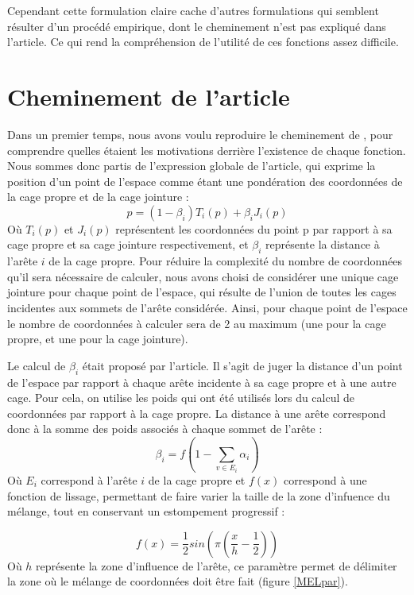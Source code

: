 Cependant cette formulation claire cache d'autres formulations qui
semblent résulter d'un procédé empirique, dont le cheminement n'est
pas expliqué dans l'article. Ce qui rend la compréhension de l'utilité
de ces fonctions assez difficile.

\section{Cheminement de l'article}
Dans un premier temps, nous avons voulu reproduire le cheminement de
\cite{GPCP13}, pour comprendre quelles étaient les motivations
derrière l'existence de chaque fonction. Nous sommes donc partis de
l'expression globale de l'article, qui exprime la position d'un point
de l'espace comme étant une pondération des coordonnées de la cage
propre et de la cage jointure :
\begin{equation}
  p = (1 - \beta_i) T_i(p)  + \beta_i J_i(p) 
  \label{MELgen}
\end{equation}
Où $T_i(p)$ et $J_i(p)$ représentent les coordonnées du point p par
rapport à sa cage propre et sa cage jointure respectivement, et
$\beta_i$ représente la distance à l'arête $i$ de la cage propre. Pour
réduire la complexité du nombre de coordonnées qu'il sera nécessaire
de calculer, nous avons choisi de considérer une unique cage jointure
pour chaque point de l'espace, qui résulte de l'union de toutes les
cages incidentes aux sommets de l'arête considérée. Ainsi, pour chaque
point de l'espace le nombre de coordonnées à calculer sera de 2 au
maximum (une pour la cage propre, et une pour la cage jointure).

Le calcul de $\beta_i$ était proposé par l'article. Il s'agit de juger
la distance d'un point de l'espace par rapport à chaque arête
incidente à sa cage propre et à une autre cage. Pour cela, on utilise
les poids qui ont été utilisés lors du calcul de coordonnées par
rapport à la cage propre. La distance à une arête correspond donc à la
somme des poids associés à chaque sommet de l'arête :
\begin{equation}
  \beta_{i} = f(1 - \sum_{v \in E_i} \alpha_i)
\end{equation}
Où $E_i$ correspond à l'arête $i$ de la cage propre et $f(x)$
correspond à une fonction de lissage, permettant de faire varier la
taille de la zone d'infuence du mélange, tout en conservant un
estompement progressif :

\begin{equation}
  f(x) = \frac{1}{2} sin(\pi(\frac{x}{h}-\frac{1}{2}))
\end{equation}
Où $h$ représente la zone d'influence de l'arête, ce paramètre permet
de délimiter la zone où le mélange de coordonnées doit être fait
(figure \ref{MELpar}).


